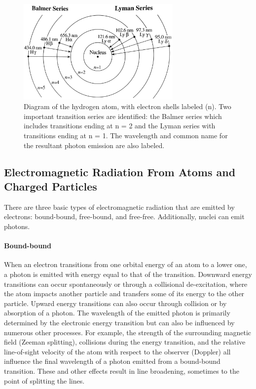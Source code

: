 \begin{figure}[!h]
    \begin{center}
	    \includegraphics[width=80mm]{Images/HydrogenTransitions.png}
    \end{center}
    \caption[Atomic transitions for Balmer and Lyman series]{
        Diagram of the hydrogen atom, with electron shells labeled (n). Two important transition series are 
        identified: the Balmer series which includes transitions ending at n = 2 and the Lyman series with 
        transitions ending at n = 1. The wavelength and common name for the resultant photon emission are also labeled. 
    }
    \label{fig:balmerandlyman}
\end{figure}

\subsection{Electromagnetic Radiation From Atoms and Charged Particles}
There are three basic types of electromagnetic radiation that are emitted by electrons: bound-bound, free-bound, and free-free. Additionally, nuclei can emit photons. 

\paragraph{Bound-bound}
When an electron transitions from one orbital energy of an atom to a lower one, a photon is emitted with energy equal to that of the transition. Downward energy transitions can occur spontaneously or through a collisional de-excitation, where the atom impacts another particle and transfers some of its energy to the other particle. Upward energy transitions can also occur through collision or by absorption of a photon. The wavelength of the emitted photon is primarily determined by the electronic energy transition but can also be influenced by numerous other processes. For example, the strength of the surrounding magnetic field (Zeeman splitting), collisions during the energy transition, and the relative line-of-sight velocity of the atom with respect to the observer (Doppler) all influence the final wavelength of a photon emitted from a bound-bound transition. These and other effects result in line broadening, sometimes to the point of splitting the lines. 

